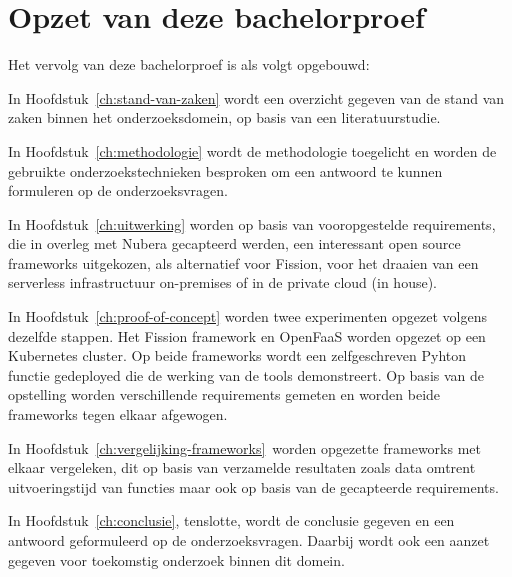\section{Opzet van deze bachelorproef}
\label{sec:opzet-bachelorproef}

Het vervolg van deze bachelorproef is als volgt opgebouwd:

In Hoofdstuk~\ref{ch:stand-van-zaken} wordt een overzicht gegeven van de stand van zaken binnen het onderzoeksdomein, op basis van een literatuurstudie.

In Hoofdstuk~\ref{ch:methodologie} wordt de methodologie toegelicht en worden de gebruikte onderzoekstechnieken besproken om een antwoord te kunnen formuleren op de onderzoeksvragen.

In Hoofdstuk~\ref{ch:uitwerking} worden op basis van vooropgestelde requirements, die in overleg met Nubera gecapteerd werden, een interessant open source frameworks uitgekozen, als alternatief voor Fission, voor het draaien van een serverless infrastructuur on-premises of in de private cloud (in house).

In Hoofdstuk~\ref{ch:proof-of-concept} worden twee experimenten opgezet volgens dezelfde stappen. Het Fission framework en OpenFaaS worden opgezet op een Kubernetes cluster. Op beide frameworks wordt een zelfgeschreven Pyhton functie gedeployed die de werking van de tools demonstreert. Op basis van de opstelling worden verschillende requirements gemeten en worden beide frameworks tegen elkaar afgewogen.

In Hoofdstuk~\ref{ch:vergelijking-frameworks} worden opgezette frameworks met elkaar vergeleken, dit op basis van verzamelde resultaten zoals data omtrent uitvoeringstijd van functies maar ook op basis van de gecapteerde requirements.

In Hoofdstuk~\ref{ch:conclusie}, tenslotte, wordt de conclusie gegeven en een antwoord geformuleerd op de onderzoeksvragen. Daarbij wordt ook een aanzet gegeven voor toekomstig onderzoek binnen dit domein.

